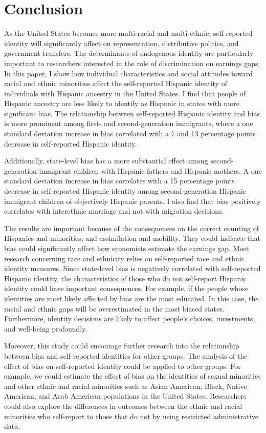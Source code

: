 \documentclass[12pt,english]{article}
\begin{document}
\section{Conclusion}\label{sec:conc}

As the United States becomes more multi-racial and multi-ethnic, self-reported identity will significantly affect on representation, distributive politics, and government transfers. The determinants of endogenous identity are particularly important to researchers interested in the role of discrimination on earnings gaps. In this paper, I show how individual characteristics and social attitudes toward racial and ethnic minorities affect the self-reported Hispanic identity of individuals with Hispanic ancestry in the United States. I find that people of Hispanic ancestry are less likely to identify as Hispanic in states with more significant bias. The relationship between self-reported Hispanic identity and bias is more prominent among first- and second-generation immigrants, where a one standard deviation increase in bias correlated with a 7 and 13 percentage points decrease in self-reported Hispanic identity. 

Additionally, state-level bias has a more substantial effect among second-generation immigrant children with Hispanic fathers and Hispanic mothers. A one standard deviation increase in bias correlates with a 15 percentage points decrease in self-reported Hispanic identity among second-generation Hispanic immigrant children of objectively Hispanic parents. I also find that bias positively correlates with interethnic marriage and not with migration decisions.

The results are important because of the consequences on the correct counting of Hispanics and minorities, and  assimilation and mobility. They could indicate that bias could significantly affect how economists estimate the earnings gap. Most research concerning race and ethnicity relies on self-reported race and ethnic identity measures. Since state-level bias is negatively correlated with self-reported Hispanic identity, the characteristics of those who do not self-report Hispanic identity could have important consequences. For example, if the people whose identities are most likely affected by bias are the most educated. In this case, the racial and ethnic gaps will be overestimated in the most biased states. Furthermore, identity decisions are likely to affect people's choices, investments, and well-being profoundly. 

Moreover, this study could encourage further research into the relationship between bias and self-reported identities for other groups. The analysis of the effect of bias on self-reported identity could be applied to other groups. For example, we could estimate the effect of bias on the identities of sexual minorities and other ethnic and racial minorities such as Asian American, Black, Native American, and Arab American populations in the United States. Researchers could also explore the differences in outcomes between the ethnic and racial minorities who self-report to those that do not by using restricted administrative data. 
\end{document}
